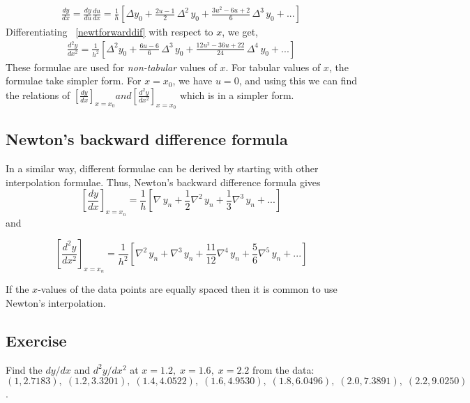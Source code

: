 \documentclass[aima203_lecturenotes_ku.tex]{subfiles}
\begin{document}
\begin{equation}
  \label{newtforwarddif}
  \begin{aligned}
    \frac{dy}{dx} =\frac{dy}{du} \frac{du}{dx} = \frac{1}{h} \left [ \Delta y_0 + \frac{2u -1}{2}\, \Delta^2\,  y_0 + \frac{3u^2-6u + 2}{6}\, \Delta^3 \, y_0 + ... \right ]
  \end{aligned}
\end{equation}
Differentiating ~\ref{newtforwarddif} with respect to $x$, we get,
\begin{equation}
  \label{newtforwarddif2}
  \begin{aligned}
    \frac{d^2y}{dx^2} = \frac{1}{h^2} \left [ \Delta^2 y_0 + \frac{6u -6}{6}\, \Delta^3 \,  y_0 + \frac{12u^2-36u + 22}{24}\, \Delta^4 \, y_0 + ... \right ]
  \end{aligned}
\end{equation}
These formulae are used for \textit{non-tabular} values of $x$. For tabular values of $x$, the formulae take simpler form. For $x=x_0$, we have $u=0$, and using this we can find the relations of $\displaystyle \left [ \frac{dy}{dx} \right ]  _{x=x_0} and \left [\frac{d^2y}{dx^2} \right ] _{x=x_0}$ which is in a simpler form.

\newpage
\subsection{Newton's backward difference formula}
In a similar way, different formulae can be derived by starting with other interpolation formulae. Thus, Newton's backward difference formula gives
\begin{equation}
  \label{newtbackwarddif}
  \left [ \frac{dy}{dx} \right ] _{x=x_n} = \frac{1}{h} \left [\nabla \, y_n + \frac{1}{2} \nabla ^2 \, y_n + \frac{1}{3} \nabla ^3 \, y_n + ... \right ]
\end{equation}
and

\begin{equation}
  \label{newtbackwarddif2}
  \left [ \frac{d^2y}{dx^2} \right ] _{x=x_n} = \frac{1}{h^2} \left [\nabla^2 \, y_n + \nabla ^3 \, y_n + \frac{11}{12} \nabla ^4 \, y_n + \frac{5}{6} \nabla ^5 \, y_n + ... \right ]
\end{equation}
\begin{remark}
   If the $x$-values of the data points are equally spaced then it is common to use Newton's interpolation.
\end{remark}
\subsection{Exercise}
Find the $dy/dx$ and $d^2y/dx^2$ at $x=1.2, \; x=1.6, \; x=2.2$ from the data: \\[1mm]
$(1, 2.7183), \; (1.2, 3.3201), \; (1.4, 4.0522), \; (1.6, 4.9530), \; (1.8, 6.0496), \; (2.0, 7.3891), \; (2.2, 9.0250)$.
\end{document}
